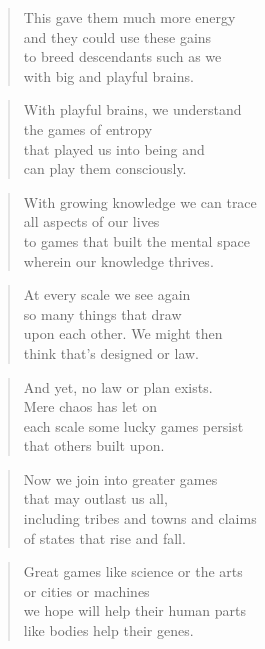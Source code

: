 \documentclass[14pt,a4paper]{article}
\begin{document}
\begin{verse}
This gave them much more energy\\
and they could use these gains\\
to breed descendants such as we\\
with big and playful brains.
\end{verse}

\begin{verse}
With playful brains, we understand\\
the games of entropy\\
that played us into being and\\
can play them consciously.
\end{verse}

\begin{verse}
With growing knowledge we can trace\\
all aspects of our lives\\
to games that built the mental space\\
wherein our knowledge thrives.
\end{verse}

\begin{verse}
At every scale we see again\\
so many things that draw\\
upon each other. We might then\\
think that’s designed or law.
\end{verse}

\begin{verse}
And yet, no law or plan exists.\\
Mere chaos has let on\\
each scale some lucky games persist\\
that others built upon.
\end{verse}

\begin{verse}
Now we join into greater games\\
that may outlast us all,\\
including tribes and towns and claims\\
of states that rise and fall.
\end{verse}

\begin{verse}
Great games like science or the arts\\
or cities or machines\\
we hope will help their human parts\\
like bodies help their genes.
\end{verse}
\end{document}

